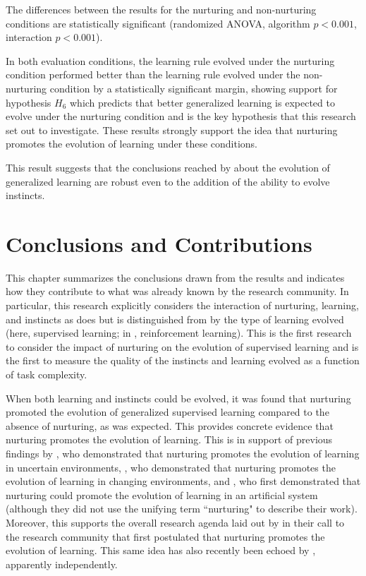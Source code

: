 \documentclass[master]{outhesis}
\begin{document}
The differences between the results for the nurturing and non-nurturing conditions are statistically significant (randomized ANOVA, algorithm $p < 0.001$, interaction $p < 0.001$).

In both evaluation conditions,
the learning rule evolved under the nurturing condition performed better than the learning rule evolved under the non-nurturing condition by a statistically significant margin,
showing support for hypothesis $H_6$ which predicts that better generalized learning is expected to evolve under the nurturing condition
and is the key hypothesis that this research set out to investigate.
These results strongly support the idea that nurturing promotes the evolution of learning under these conditions.

This result suggests that the conclusions reached by \citep{Chalmers:1990aa} about the evolution of generalized learning are robust even to the addition of the ability to evolve instincts.

\chapter{Conclusions and Contributions}

This chapter summarizes the conclusions drawn from the results and indicates how they contribute to what was already known by the research community.
In particular,
this research explicitly considers the interaction of nurturing, learning, and instincts as does \citet{Shah:2015hs}
but is distinguished from \citeauthor{Shah:2015hs} by the type of learning evolved
(here, supervised learning; in \citeauthor{Shah:2015hs}, reinforcement learning).
This is the first research to consider the impact of nurturing on the evolution of supervised learning
and is the first to measure the quality of the instincts and learning evolved as a function of task complexity.

When both learning and instincts could be evolved,
it was found that nurturing promoted the evolution of generalized supervised learning compared to the absence of nurturing,
as was expected.
This provides concrete evidence that nurturing promotes the evolution of learning.
This is in support of previous findings by \citet{Eskridge:2012aa},
who demonstrated that nurturing promotes the evolution of learning in uncertain environments,
\citet{Shah:2015hs},
who demonstrated that nurturing promotes the evolution of learning in changing environments,
and \citet{McQuesten:1997aa},
who first demonstrated that nurturing could promote the evolution of learning in an artificial system
(although they did not use the unifying term ``nurturing" to describe their work).
Moreover,
this supports the overall research agenda laid out by \citet{Woehrer:2012aa}
in their call to the research community that first postulated that nurturing promotes the evolution of learning.
This same idea has also recently been echoed by \citet{Soltoggio:2017bl},
apparently independently.
\end{document}
